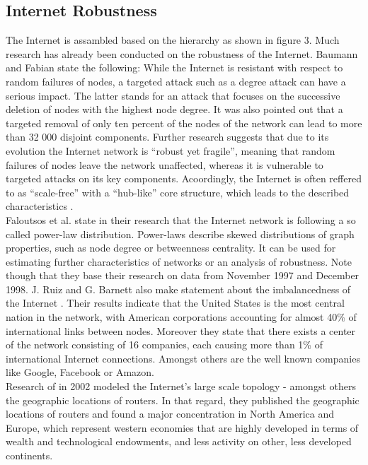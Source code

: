 \documentclass[conference, 11pt]{IEEEtran}
\begin{document}
\subsection{Internet Robustness}
The Internet is assambled based on the hierarchy as shown in figure 3. Much research has already been conducted on the robustness of the Internet. Baumann and Fabian \cite{howRobust} state the following: While the Internet is resistant with respect to random failures of nodes, a targeted attack such as a degree attack can have a serious impact. The latter stands for an attack that focuses on the successive deletion of nodes with the highest node degree. It was also pointed out that a targeted removal of only ten percent of the nodes of the network can lead to more than 32 000 disjoint components. Further research suggests that due to its evolution the Internet network  is ``robust yet fragile''\cite{RYF}, meaning that random failures of nodes leave the network unaffected, whereas it is vulnerable to targeted attacks on its key components. Acoordingly, the Internet is often reffered to as ``scale-free'' with a ``hub-like'' core structure, which leads to the described characteristics \cite{RYF}. \\ Faloutsos et al. \cite{powerlawCitation} state in their research that the Internet network is following a so called power-law distribution. Power-laws describe skewed distributions of graph properties, such as node degree or betweenness centrality. It can be used for estimating further characteristics of networks or an analysis of robustness. Note though that they base their research on data from November 1997 and December 1998. J. Ruiz and G. Barnett also make statement about the imbalancedness of the Internet \cite{owningInternet}. Their results indicate that the United States is the most central nation in the network, with American corporations accounting for almost 40\% of international links between nodes. Moreover they state that there exists a center of the network consisting of 16 companies, each causing more than 1\% of international Internet connections. Amongst others are the well known companies like Google, Facebook or Amazon. \\ \linebreak
Research of \cite{geoResearch} in 2002 modeled the Internet's large scale topology - amongst others the geographic locations of routers. In that regard, they published the geographic locations of routers and found a major concentration in North America and Europe, which represent western economies that are highly developed in terms of wealth and technological endowments, and less activity on other, less developed continents.\\  \linebreak
 
\end{document}

